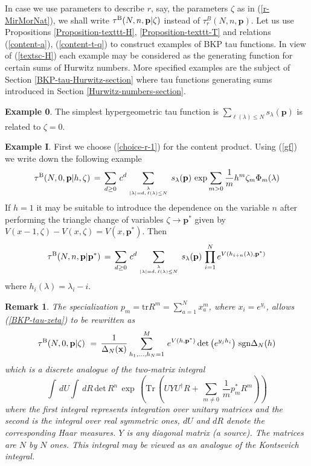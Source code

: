 \documentclass[a4paper,10pt]{article}
\newcommand{\sgn}{\mathop\mathrm{sgn}\nolimits}
\newcommand{\bpow}{\mathbf{p}}
\theoremstyle{plain}
\newtheorem{Remark}{Remark}
\theoremstyle{remark}
\def\Tr{\mathrm {Tr}}
\def\tr{\mathrm {tr}}
\def\det{\mathrm {det}}
\def\be{\begin{equation}}
\def\ee{\end{equation}}
\def\br{\begin{Remark}\rm\small}
\def\er{\end{Remark}}
\def\Tr{\mathrm {Tr}}
\def\tr{\mathrm {tr}}
\def\det{\mathrm {det}}
\def\sgn{\mathrm {sgn}}
\begin{document}
In case we use parameters to describe $r$, say, the parameters $\zeta$ as in (\ref{r-MirMorNat}), we shall write
$\tau^{\rm B}(N,n,\bpow|\zeta)$
instead of $\tau_r^B(N,n,\bpow)$.
Let us use Propositions \ref{Proposition-texttt-H}, \ref{Proposition-texttt-T}
 and relations (\ref{content-a}), (\ref{content-t-q}) to construct examples of BKP tau functions.
In view of (\ref{textsc-H}) each example may be considered as the generating function for certain sums
of Hurwitz numbers. More specified examples are the subject of Section \ref {BKP-tau-Hurwitz-section} where tau functions
generating sums introduced in Section \ref{Hurwitz-numbers-section}.

{\bf Example 0}. The simplest hypergeometric tau function is $\sum_{\ell(\lambda)\le N} s_\lambda(\bpow)$ is
related to $\zeta=0$.

 {\bf Example I}. First  we choose (\ref{choice-r-1}) for the content product. Using (\ref{gf})  we write
 down the following  example
\be\label{BKP-tau-zeta}
\tau^{\rm B}(N,0,\bpow|h,\zeta)\,=\,\sum_{d\ge 0}\, c^d
\sum_{\lambda \atop |\lambda|=d,\, \ell(\lambda)\le N}\,
s_\lambda(\bpow)\, \exp \sum_{m>0} \frac 1m h^m \zeta_m \Phi_m(\lambda)
\ee
If $h=1$ it may be suitable to introduce
the dependence on the variable $n$  after performing the triangle change of variables
$\zeta \to \bpow^* $
given by $V(x-1,\zeta)-V(x,\zeta)=V(x,\bpow^*)$. Then
\be\label{BKP-tau-zeta-to-p^*}
\tau^{\rm B}(N,n,\bpow|\bpow^*)\,=\,\sum_{d\ge 0} \, c^d
\sum_{\lambda\atop |\lambda|=d,\, \ell(\lambda)\le N}\,
s_\lambda(\bpow)\, \prod_{i=1}^N
e^{V(h_{i+n}(\lambda),\bpow^*)}
\ee
where $h_i(\lambda)=\lambda_i-i$.
\br


The specialization $p_m=\tr R^m=\sum_{a=1}^N x_a^m$, where  $x_i=
e^{y_i}$, allows (\ref{BKP-tau-zeta}) to be
rewritten as
  \be
 \tau^{\rm B}(N,0,\bpow|\zeta)\  =\,\frac{1}{\Delta_N({\bf x})} \sum_{h_1,\dots,h_N=1}^M\,
e^{V(h,\bpow^*)}\,\det\left(e^{y_jh_i}\right)\,\sgn \Delta_N(h)
  \ee
which is a discrete analogue of the two-matrix integral
  \be
\int \, dU \int \, dR\,\det\,R^n\,\exp\,\left(\Tr\,\left(UYU^\dag R+ \,\sum_{m\neq 0}\,\frac 1m p^*_mR^m\right) \right)
  \ee
where the first integral represents integration over unitary matrices and the second is the integral over real
symmetric ones, $dU$ and $dR$ denote the corresponding Haar measures.
$Y$ is any diagonal matrix (a source). The matrices are $N$ by $N$ ones.
This integral may be viewed as an analogue of the Kontsevich integral.


\er
\end{document}
